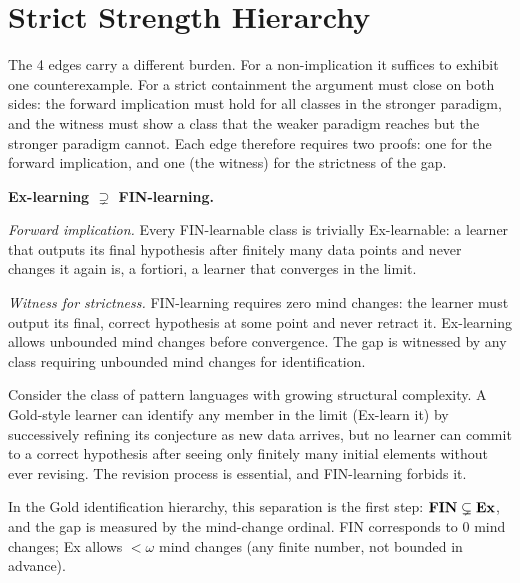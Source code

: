 
\section{Strict Strength Hierarchy}
\label{sec:strict-hierarchy}

The 4  edges carry a different burden. For a
non-implication it suffices to exhibit one counterexample. For a strict
containment the argument must close on both sides: the forward implication
must hold for all classes in the stronger paradigm, and the witness must
show a class that the weaker paradigm reaches but the stronger paradigm
cannot. Each edge therefore requires two proofs: one for the forward
implication, and one (the witness) for the strictness of the gap.


\begin{separation}
\textbf{Ex-learning $\supsetneq$ FIN-learning.}

\medskip\noindent
\emph{Forward implication.} Every FIN-learnable class is trivially
Ex-learnable: a learner that outputs its final hypothesis after finitely
many data points and never changes it again is, a fortiori, a learner
that converges in the limit.

\medskip\noindent
\emph{Witness for strictness.}
FIN-learning requires zero mind changes: the learner must output its
final, correct hypothesis at some point and never retract it. Ex-learning
allows unbounded mind changes before convergence. The gap is witnessed
by any class requiring unbounded mind changes for identification.

Consider the class of pattern languages with growing structural
complexity. A Gold-style learner can identify any member in the limit
(Ex-learn it) by successively refining its conjecture as new data
arrives, but no learner can commit to a correct hypothesis after seeing
only finitely many initial elements without ever revising. The revision
process is essential, and FIN-learning forbids it.

In the Gold identification hierarchy, this separation is the first step:
$\mathbf{FIN} \subsetneq \mathbf{Ex}$, and the gap is measured by the mind-change
ordinal. FIN corresponds to $0$ mind changes; Ex allows $< \omega$ mind
changes (any finite number, not bounded in advance).

\hfill\cite{Gold1967}
\end{separation}

